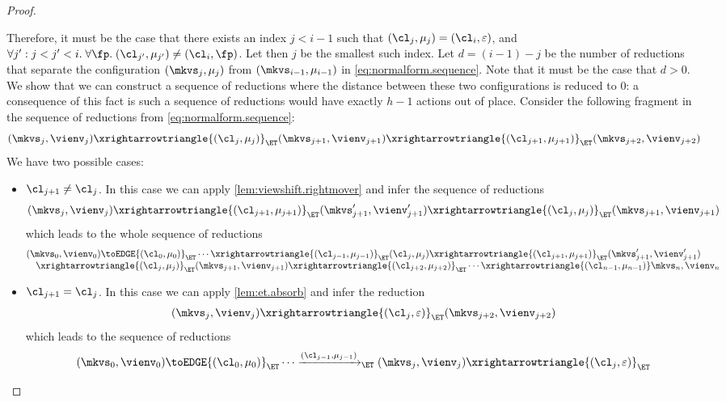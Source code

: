 \begin{proof}
\begin{enumerate}
Therefore, it must be the case that there exists an index $j < i-1$ such that $(\cl_{j}, \mu_{j}) = (\cl_{i}, \varepsilon)$, 
and $\forall j': j< j' < i.\;\forall \fp.\;(\cl_{j'}, \mu_{j'}) \neq (\cl_{i}, \fp)$. Let then $j$ be the smallest such index. 
Let $d = (i-1)-j$ be the number of reductions that separate the configuration $(\mkvs_{j}, \mu_{j})$ from 
$(\mkvs_{i-1}, \mu_{i-1})$ in \cref{eq:normalform.sequence}. Note that it must be the case that $d > 0$. We show that we can 
construct a sequence of reductions where the distance between these two configurations is reduced to $0$: 
a consequence of this fact is such a sequence of reductions would have exactly $h-1$ actions out of place.
Consider the following fragment in the sequence of reductions from \cref{eq:normalform.sequence}:
\[
(\mkvs_{j}, \vienv_{j}) \xrightarrowtriangle{(\cl_{j}, \mu_{j})}_{\ET} (\mkvs_{j+1}, \vienv_{j+1}) 
\xrightarrowtriangle{(\cl_{j+1}, \mu_{j+1})}_{\ET} (\mkvs_{j+2}, \vienv_{j+2})
\]
We have two possible cases: 
\begin{itemize}
\item $\cl_{j+1} \neq \cl_{j}$. In this case we can apply \cref{lem:viewshift.rightmover} and infer the sequence of 
reductions 
\[
(\mkvs_{j}, \vienv_{j}) \xrightarrowtriangle{(\cl_{j+1}, \mu_{j+1})}_{\ET} (\mkvs_{j+1}', \vienv_{j+1}') 
\xrightarrowtriangle{(\cl_{j}, \mu_{j})}_{\ET} (\mkvs_{j+1}, \vienv_{j+1})
\]
which leads to the whole sequence of reductions 
\[
\begin{array}{@{}l@{}}
(\mkvs_{0}, \vienv_{0}) \toEDGE{(\cl_{0}, \mu_{0})}_{\ET} \cdots 
\xrightarrowtriangle{(\cl_{j-1}, \mu_{j-1})}_{\ET} (\cl_{j}, \mu_{j}) 
\xrightarrowtriangle{(\cl_{j+1}, \mu_{j+1})}_{\ET} (\mkvs'_{j+1}, \vienv'_{j+1})  \\
\quad \xrightarrowtriangle{(\cl_{j}, \mu_{j})}_{\ET} (\mkvs_{j+1}, \vienv_{j+1})  
\xrightarrowtriangle{(\cl_{j+2}, \mu_{j+2})}_{\ET} \cdots \xrightarrowtriangle{(\cl_{n-1}, \mu_{n-1})} \mkvs_{n}, \vienv_{n}
\end{array}
\]
\item $\cl_{j+1} = \cl_{j}$. In this case we can apply \cref{lem:et.absorb} and infer the reduction 
\[
(\mkvs_{j}, \vienv_{j}) \xrightarrowtriangle{(\cl_{j}, \varepsilon)}_{\ET} (\mkvs_{j+2}, \vienv_{j+2})
\]
which leads to the sequence of reductions 
\[
\begin{array}{@{}l@{}}
(\mkvs_{0}, \vienv_{0}) \toEDGE{(\cl_{0}, \mu_{0})}_{\ET} \cdots 
\xrightarrow{(\cl_{j-1}, \mu_{j-1})}_{\ET} (\mkvs_{j}, \vienv_{j}) \xrightarrowtriangle{(\cl_{j}, \varepsilon)}_{\ET}  \\

\end{array}\]
\end{itemize}
\end{enumerate}
\end{proof}
